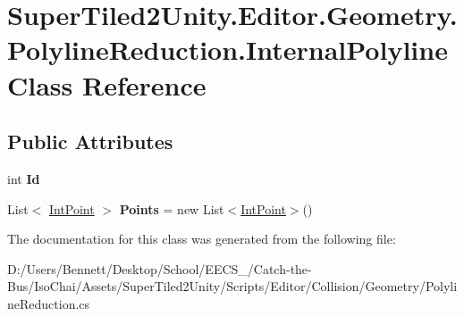 \hypertarget{class_super_tiled2_unity_1_1_editor_1_1_geometry_1_1_polyline_reduction_1_1_internal_polyline}{}\section{Super\+Tiled2\+Unity.\+Editor.\+Geometry.\+Polyline\+Reduction.\+Internal\+Polyline Class Reference}
\label{class_super_tiled2_unity_1_1_editor_1_1_geometry_1_1_polyline_reduction_1_1_internal_polyline}
\subsection*{Public Attributes}
\begin{DoxyCompactItemize}
\item 
\mbox{\label{class_super_tiled2_unity_1_1_editor_1_1_geometry_1_1_polyline_reduction_1_1_internal_polyline_a83d30eeebb4c505bcc4fe336596e2c0c}} 
int {\bfseries Id}
\item 
\mbox{\label{class_super_tiled2_unity_1_1_editor_1_1_geometry_1_1_polyline_reduction_1_1_internal_polyline_a03fb2e56eb773caf8f33468a4732edb5}} 
List$<$ \mbox{\hyperlink{struct_super_tiled2_unity_1_1_editor_1_1_clipper_lib_1_1_int_point}{Int\+Point}} $>$ {\bfseries Points} = new List$<$\mbox{\hyperlink{struct_super_tiled2_unity_1_1_editor_1_1_clipper_lib_1_1_int_point}{Int\+Point}}$>$()
\end{DoxyCompactItemize}


The documentation for this class was generated from the following file\+:\begin{DoxyCompactItemize}
\item 
D\+:/\+Users/\+Bennett/\+Desktop/\+School/\+E\+E\+C\+S\+\_/\+Catch-\/the-\/\+Bus/\+Iso\+Chai/\+Assets/\+Super\+Tiled2\+Unity/\+Scripts/\+Editor/\+Collision/\+Geometry/Polyline\+Reduction.\+cs\end{DoxyCompactItemize}
